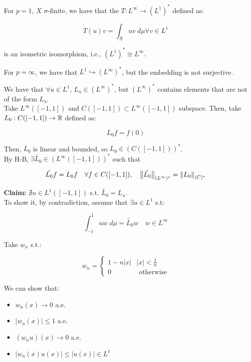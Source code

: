 \begin{ftheorem}
    For $p = 1$, $X$ $\sigma$-finite, we have that the $T: L^{\infty} \to (L^1)^*$ defined
    as:

    $$T(u) v = \int_X uv \; d\mu \forall v \in L^1$$

    is an isometric isomorphism, i.e., $(L^1)^* \cong L^{\infty}$.
\end{ftheorem}

\begin{ftheorem}
    For $p = \infty$, we have that $L^1 \hookrightarrow (L^{\infty})^*$, but the
    embedding is not surjective.
\end{ftheorem}

\vspace{1em}

\begin{fexample}
    We have that $\forall u \in L^1$, $L_u \in (L^{\infty})^*$, but
    $(L^{\infty})^*$ contains elements that are not of the form $L_u$.\\

    Take $L^{\infty}([-1, 1])$ and $C([-1, 1]) \subset L^{\infty}([-1, 1])$ 
    subspace. Then, take $L_0: C([-1, 1]) \to \mathbb{R}$ defined as:

    $$L_0 f = f(0)$$

    Then, $L_0$ is linear and bounded, so $L_0 \in (C([-1, 1]))^*$.\\

    By H-B, $\exists \tilde{L_0} \in (L^{\infty}([-1, 1]))^*$ such that

    $$\tilde{L_0} f = L_0 f \quad \forall f \in C([-1, 1]), \quad \left\|\tilde{L_0}\right\|_{(L^{\infty})^*} = \left\|L_0\right\|_{(C)^*}$$

    \textbf{Claim:} $\nexists u \in L^1([-1, 1])$ s.t. $\tilde{L_0} = L_u$.\\

    To show it, by contradiction, assume that $\exists u \in L^1$ s.t:

    $$\int_{-1}^1 u w \; d \mu = \tilde{L_0} w \quad w \in L^{\infty}$$

    Take $w_n$ s.t.:

    $$w_n = \begin{cases}
        1 - n |x| & |x| < \frac{1}{n}\\
        0 & \text{ otherwise}
    \end{cases}$$

    We can show that:
    \vspace{1em}
    \begin{itemize}
        \item $w_n(x) \to 0$ a.e.
        \vspace{1em}
        \item $|w_n(x)| \leq 1$ a.e.
        \vspace{1em}
        \item $(w_n u)(x) \to 0$ a.e.
        \vspace{1em}
        \item $|w_n(x) u(x)| \leq |u(x)| \in L^1$
    \end{itemize}
    \vspace{1em}


\end{fexample}
